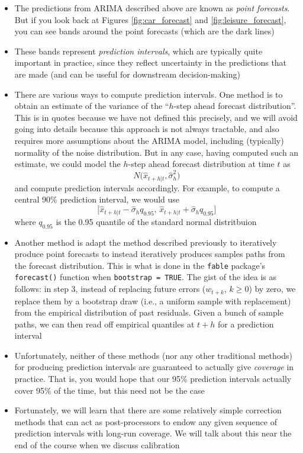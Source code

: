 \documentclass{article}
\begin{document}
\begin{itemize}
\item The predictions  from ARIMA described above are 
    known as \emph{point forecasts}. But if you look back at Figures
    \ref{fig:car_forecast} and \ref{fig:leisure_forecast}, you can see bands
    around the point forecasts (which are the dark lines) 

\item These bands represent \emph{prediction intervals}, which are typically
  quite important in practice, since they reflect uncertainty in the predictions 
  that are made (and can be useful for downstream decision-making)  

\item There are various ways to compute prediction intervals. One method is to
  obtain an estimate  of the variance of the ``$h$-step
  ahead forecast distribution''. This is in quotes because we have not defined
  this precisely, and we will avoid going into details because this approach is
  not always tractable, and also requires more assumptions about the ARIMA
  model, including (typically) normality of the noise distribution. But in any
  case, having computed such an estimate, we could model the $h$-step ahead
  forecast distribution at time $t$ as
  \[
  N\big( \hat{x}_{t+h | t}, \hat\sigma^2_h \big)
  \]
  and compute prediction intervals accordingly. For example, to compute a
  central 90\% prediction interval, we would use 
  \[
  \big[\hat{x}_{t+h | t} - \hat\sigma_h q_{0.95}, \, \hat{x}_{t+h | t} +  
  \hat\sigma_h q_{0.95} \big]
  \]
  where $q_{0.95}$ is the 0.95 quantile of the standard normal distritbuion

\item Another method is adapt the method described previously to iteratively
  produce point forecasts to instead iteratively produces samples paths from the
  forecast distribution. This is what is done in the \verb|fable| package's
  \verb|forecast()| function when \verb|bootstrap = TRUE|. The gist of the idea
  is as follows: in step 3, instead of replacing future errors ($w_{t+k}$, $k
  \geq 0$) by zero, we replace them by a bootstrap draw (i.e., a uniform sample
  with replacement) from the empirical distribution of past residuals. Given a
  bunch of sample paths, we can then read off empirical quantiles at $t+h$ for a
  prediction interval  

\item Unfortunately, neither of these methods (nor any other traditional
  methods) for producing prediction intervals are guaranteed to actually give
  \emph{coverage} in practice. That is, you would hope that our 95\% prediction 
  intervals actually cover 95\% of the time, but this need not be the case

\item Fortunately, we will learn that there are some relatively simple
  correction methods that can act as post-processors to endow any given sequence
  of prediction intervals with long-run coverage. We will talk about this near the 
  end of the course when we discuss calibration  
\end{itemize}
\end{document}
